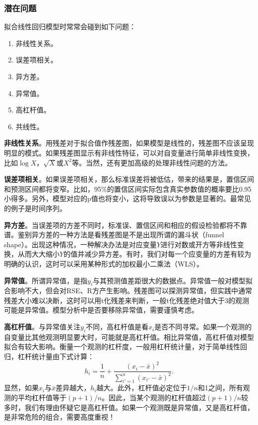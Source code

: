 \documentclass[hyperref,]{ctexart}
\providecommand{\tightlist}{%
  \setlength{\itemsep}{0pt}\setlength{\parskip}{0pt}}
\begin{document}
\subsubsection{潜在问题}

拟合线性回归模型时常常会碰到如下问题：

\begin{enumerate}
\def\labelenumi{\arabic{enumi}.}
\tightlist
\item
  非线性关系。
\item
  误差项相关。
\item
  异方差。
\item
  异常值。
\item
  高杠杆值。
\item
  共线性。
\end{enumerate}

\textbf{非线性关系}。用残差对于拟合值作残差图，如果模型是线性的，残差图不应该呈现明显的模式。如果残差图显示有非线性特征，可以对自变量进行简单非线性变换，比如\(\log X\)，\(\sqrt{X}\)或\(X^2\)等。当然，还有更加高级的处理非线性问题的方法。

\textbf{误差项相关}。如果误差项相关，那么标准误差将被低估，带来的结果是，置信区间和预测区间都将变窄。比如，95\%的置信区间实际包含真实参数值的概率要比0.95小得多。另外，模型对应的p值也将变小，这将导致误以为参数是显著的。最常见的例子是时间序列。

\textbf{异方差}。当误差项的方差不同时，标准误、置信区间和相应的假设检验都将不靠谱。鉴别异方差的一种方法是看残差图是不是出现所谓的漏斗状（funnel
shape）。出现这种情况，一种解决办法是对应变量\(Y\)进行对数或开方等非线性变换，从而大大缩小\(Y\)的值并减少异方差。有时，我们对每一个应变量的方差有较为明确的认识，这时可以采用某种形式的加权最小二乘法（WLS）。

\textbf{异常值}。所谓异常值，是指\(y_i\)与其预测值差距很大的数据点。异常值一般对模型拟合影响不大，但会对RSE、R方产生影响。残差图可以探测异常值，但实践中通常残差大小难以决断，这时可以用t化残差来判断，一般t化残差绝对值大于3的观测可能是异常值。模型分析中是否要移除异常值，需要谨慎考虑。

\textbf{高杠杆值}。与异常值关注\(y_i\)不同，高杠杆值是看\(x_i\)是否不同寻常。如果一个观测的自变量比其他观测明显要大时，可能就是高杠杆值。相比异常值，高杠杆值对模型拟合有较大影响。衡量一个观测的杠杆度，一般用杠杆统计量，对于简单线性回归，杠杆统计量由下式计算：
\[h_i = \frac{1}{n} + \frac{(x_i - \bar{x})^2} {\sum_{i'=1}^n (x_{i'} - \bar{x})^2}.\]
显然，如果\(x_i\)与\(\bar{x}\)差异越大，\(h_i\)越大。此外，杠杆值必定位于\(1/n\)和1之间，所有观测的平均杠杆值等于\((p+1)/n\)。因此，当某个观测的杠杆值超过\((p+1)/n\)较多时，我们有理由怀疑它是高杠杆值。如果一个观测既是异常值，又是高杠杆值，是非常危险的组合，需要高度重视！
\end{document}
